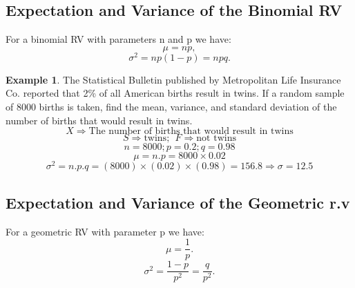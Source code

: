 \documentclass[12pt]{article}
\theoremstyle{definition}
\newtheorem{exmp}{Example}[section]
\begin{document}
\subsection{Expectation and Variance of the Binomial RV}
For a binomial RV with parameters n and p we have:
\[
    \mu = np, 
\]
\[
    \sigma^2 = np(1-p) = npq.
\]
\begin{exmp}
     The Statistical Bulletin published by Metropolitan Life Insurance Co.
     reported that 2\% of all American births result in twins. If a random
     sample of 8000 births is taken, find the mean, variance, and standard
     deviation of the number of births that would result in twins.
     \[
         X \Rightarrow \text{The number of births that would result in twins}
     \]
     \[
         S \Rightarrow \text{twins}; \ \ F \Rightarrow \text{not twins}
     \]
     \[
         n = 8000; p = 0.2; q = 0.98 
     \]
     \[
         \mu = n.p = 8000 \times 0.02 
     \]
     \[
         \sigma^2 = n.p.q = (8000) \times (0.02) \times (0.98) = 156.8 \Rightarrow \sigma = 12.5
     \]
\end{exmp}    
\subsection{Expectation and Variance of the Geometric r.v}
For a geometric RV with parameter p we have:
\[
    \mu = \frac{1}{p}.
\]
\[
    \sigma^2 = \frac{1-p}{p^2} = \frac{q}{p^2}.
\]
\end{document}
